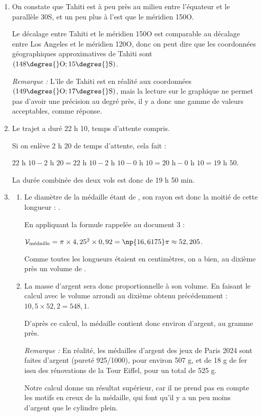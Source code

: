 \begin{enumerate}
	\item On constate que Tahiti est à peu près au milieu entre l'équateur et le parallèle 30\degres{}S, et un peu plus à l'est que le méridien 150\degres{}O.

	Le décalage entre Tahiti et le méridien 150\degres{}O est comparable au décalage entre Los Angeles et le méridien 120\degres{}O, donc on peut dire que les coordonnées géographiques approximatives de Tahiti sont $(148\degres{}\mathrm{O} ; 15\degres{}\mathrm{S})$.

	\emph{Remarque :} L'île de Tahiti est en réalité aux coordonnées $(149\degres{}\mathrm{O} ; 17\degres{}\mathrm{S})$, mais la lecture sur le graphique ne permet pas d'avoir une précision au degré près, il y a donc une gamme de valeurs acceptables, comme réponse.

	\item Le trajet a duré 22 h 10, temps d'attente compris.

	Si on enlève 2 h 20 de temps d'attente, cela fait :

	$22\text{ h }10 - 2\text{ h }20 = 22\text{ h }10 - 2 \text{ h }10 - 0\text{ h }10 = 20\text{ h} - 0\text{ h }10 = 19\text{ h }50$.

	La durée combinée des deux vols est donc de 19 h 50 min.

	\item \begin{enumerate}
		\item Le diamètre de la médaille étant de , son rayon est donc la moitié de cette longueur : .

		En appliquant la formule rappelée au document 3 :

		$\mathcal{V}_{\text{médaille}} = \pi \times 4,25^2 \times 0,92 = \np{16,6175}\pi \approx52,205$.

		Comme toutes les longueurs étaient en centimètres, on a bien, au dixième près un volume de .

		\item La masse d'argent sera donc proportionnelle à son volume. En faisant le calcul avec le volume arrondi au dixième obtenu précédemment :\quad
		$10,5 \times 52,2 = 548,1$.

		D'après ce calcul, la médaille contient donc environ  d'argent, au gramme près.

		\emph{Remarque :} En réalité, les médailles d'argent des jeux de Paris 2024 sont faites d'argent (pureté 925/1000), pour environ 507 g, et de 18 g de fer issu des rénovations de la Tour Eiffel, pour un total de 525 g.

		Notre calcul donne un résultat supérieur, car il ne prend pas en compte les motifs en creux de la médaille, qui font qu'il y a un peu moins d'argent que le cylindre plein.


	\end{enumerate}
\end{enumerate}
